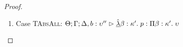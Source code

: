 \begin{proof}
\begin{enumerate}
  First, the syntax:
  \begin{tabbedproof}
    \oo By inversion, $\judgeA[\Theta, \beta:\kappa'; \Gamma; \Delta, b:\upsilon'']{p}{\upsilon}$ \\
    \oo By weakening, $\judgeA[\Theta, \beta:\kappa']{\Gamma}{r}{\upsilon''}$ \\
    \oo By induction, $\judgeA[\Theta, \beta:\kappa'; \Gamma; \Delta]{{[r/b]}p}{\upsilon}$ \\
    \oo By rule, $\judgeA[\Theta; \Gamma; \Delta]{\pfun{\beta}{\kappa'}{{[r/b]}p}}{\kappa' \To \upsilon}$ \\
    \oo By def of subst, $\judgeA{{[r/b]}(\pfun{\beta}{\kappa'}{p})}{\kappa' \To \upsilon}$ \\
  \end{tabbedproof}
  For semantics, consider $\interp{\judgeA{[r/b](\pfun{\beta}{\kappa'}{p})}{\kappa' \To \upsilon}}\;\theta\;\gamma\;\delta$ \\
  \begin{eqnproof}
          {Semantics}
          {Induction}
          {Semantics}
  \end{eqnproof}
  This case relies upon the fact that $\Gamma$ and $\Delta$ do not have $\beta$ free and the 
  equality of sorts under substitution. 

\item Case \textsc{TAbsAll}: $\judgeA[\Theta; \Gamma; \Delta, b:\upsilon'']{\pfunall{\beta}{\kappa'}{p}}{\forallsort{\beta}{\kappa'}{\upsilon}}$
  

\end{enumerate}
\end{proof}
